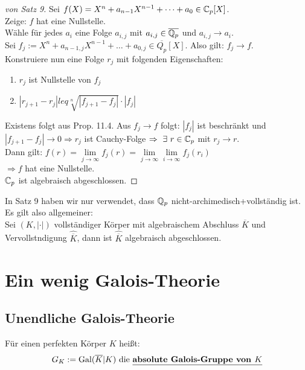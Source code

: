 \begin{proof}[von Satz 9]
Sei $f(X)=X^n+a_{n-1}X^{n-1} + \dots + a_0 \in \mathbb{C}_p[X]$.\\
Zeige: $f$ hat eine Nullstelle.\\
Wähle für jedes $a_i$ eine Folge $a_{i,j}$ mit $a_{i,j} \in \overline{\mathbb{Q}_p}$ und $a_{i,j} \to a_i$.\\
Sei $f_j:=X^n +a_{n-1,j} X^{n-1} + \dots + a_{0,j} \in \overline{Q_p}[X]$. Also gilt: $f_j \to f$.\\
Konstruiere nun eine Folge $r_j$ mit folgenden Eigenschaften:
\begin{enumerate}[(1)]
\item $r_j$ ist Nullstelle von $f_j$
\item $|r_{j+1}-r_j| leq \sqrt[n]{|f_{j+1}-f_j|} \cdot|f_j|$
\end{enumerate}
Existens folgt aus Prop. 11.4. Aus $f_j \to f$ folgt: $|f_j|$ ist beschränkt und $|f_{j+1}-f_j| \to 0 \Rightarrow r_j$ ist Cauchy-Folge $\Rightarrow \ \exists \ r \in \mathbb{C}_p$ mit $r_j \to r$.\\
Dann gilt: $f(r)= \lim\limits_{j\to \infty} f_j(r)=\lim\limits_{j\to \infty}\lim\limits_{i\to \infty} f_j(r_i)$\\
$\Rightarrow f$ hat eine Nullstelle.\\
$\mathbb{C}_p$ ist algebraisch abgeschlossen.
\end{proof}

\begin{Bem}
In Satz 9 haben wir nur verwendet, dass $\mathbb{Q}_p$ nicht-archimedisch+vollständig ist. Es gilt also allgemeiner:\\
Sei $(K, |\cdot|)$ vollständiger Körper mit algebraischem Abschluss $\overline{K}$ und Vervollstndigung $\hat{\overline{K}}$, dann ist $\hat{\overline{K}}$ algebraisch abgeschlossen.
\end{Bem}

\chapter{Ein wenig Galois-Theorie}
\section{Unendliche Galois-Theorie}
\begin{defi}
Für einen perfekten Körper $K$ heißt:
\[G_K:=\operatorname{Gal}(\overline{K} | K) \text{ die \underline{\textbf{absolute Galois-Gruppe von $K$}}}\]
\end{defi}

